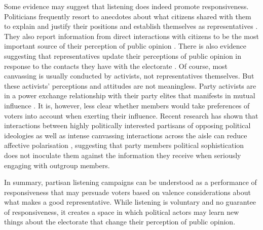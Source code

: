 \documentclass[11pt,a4paper]{scrartcl}
\begin{document}
Some evidence may suggest that listening does indeed promote responsiveness.
Politicians frequently resort to anecdotes about what citizens shared with them to explain and justify their positions and establish themselves as representatives \autocites{sawardRepresentativeClaim2006}. They also report information from direct interactions with citizens to be the most important source of their perception of public opinion \autocite{walgraveHowPoliticiansLearn2023}. There is also evidence suggesting that representatives update their perceptions of public opinion  in response to the contacts they have with the electorate \autocite{broockmanBiasPerceptionsPublic2018}. Of course, most canvassing is usually conducted by activists, not representatives themselves. But these activists' perceptions and attitudes are not meaningless. Party activists are in a power exchange relationship with their party elites that manifests in mutual influence \autocites[22-22]{panebiancoPoliticalPartiesOrganization1988}{whiteleyExplainingPartyActivism1994}.
It is, however, less clear whether members would take preferences of voters into account when exerting their influence.
Recent research has shown that interactions between highly politically interested partisans of opposing political ideologies as well as intense canvassing interactions across the aisle can reduce affective polarisation \autocites{hoboltPolarizingEffectPartisan2024}{kallaVoterOutreachCampaigns2022}, suggesting that party members political sophistication does not inoculate them against the information they receive when seriously engaging with outgroup members.

In summary, partisan listening campaigns can be understood as a performance of responsiveness that may persuade voters based on valence considerations about what makes a good representative. While listening is voluntary and no guarantee of responsiveness, it creates a space in which political actors may learn new things about the electorate that change their perception of public opinion.



\end{document}
